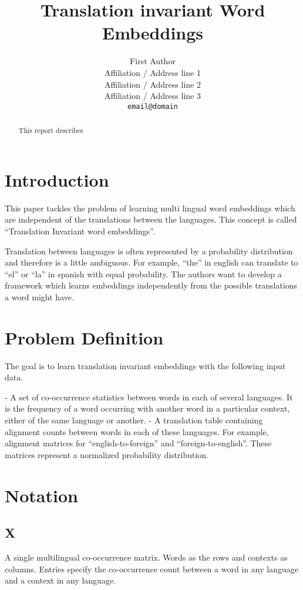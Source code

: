\documentclass[11pt]{article}
\title{Translation invariant Word Embeddings}
\author{First Author \\
  Affiliation / Address line 1 \\
  Affiliation / Address line 2 \\
  Affiliation / Address line 3 \\
  {\tt email@domain}}
\date{}
\begin{document}
\maketitle
\begin{abstract}
This report describes \cite{huang2015translation}
\end{abstract}

\section{Introduction}
This paper tackles the problem of learning multi lingual word embeddings which are independent of the translations between the languages.  This concept is called “Translation Invariant word embeddings”.

Translation between languages is often represented by a probability distribution and therefore is a little ambiguous. For example, “the” in english can translate to “el” or “la” in spanish with equal probability. The authors want to develop a framework which learns embeddings independently from the possible translations a word might have.



\section{Problem Definition}
The goal is to learn translation invariant embeddings with the following input data.

- A set of co-occurrence statistics between words in each of several languages. It is the frequency of a word occurring with another word in a particular context, either of the same language or another. 
- A translation table containing alignment counts between words in each of these languages. For example, alignment matrices for “english-to-foreign” and “foreign-to-english”. These matrices represent a normalized probability distribution.

\section{Notation}

\subsection{X}
A single multilingual co-occurrence matrix.
Words as the rows and contexts as columns.
Entries specify the co-occurrence count between a word in any language and a context in any language.
\end{document}
